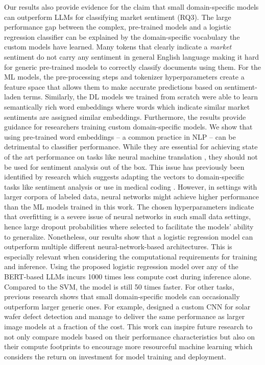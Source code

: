 Our results also provide evidence for the claim that small domain-specific models can outperform LLMs for classifying market sentiment (RQ3). The large performance gap between the complex, pre-trained models and a logistic regression classifier can be explained by the domain-specific vocabulary the custom models have learned. Many tokens that clearly indicate a \emph{market} sentiment do not carry any sentiment in general English language making it hard for generic pre-trained models to correctly classify documents using them.  For the ML models, the pre-processing steps and tokenizer hyperparameters create a feature space that allows them to make accurate predictions based on sentiment-laden terms. Similarly, the DL models we trained from scratch were able to learn semantically rich word embeddings where words which indicate similar market sentiments are assigned similar embeddings. Furthermore, the results provide guidance for researchers training custom domain-specific models. We show that using pre-trained word embeddings -- a common practice in NLP -- can be detrimental to classifier performance. While they are essential for achieving state of the art performance on tasks like neural machine translation , they should not be used for sentiment analysis out of the box. This issue has previously been identified by research which suggests adapting the vectors to domain-specific tasks like sentiment analysis  or use in medical coding .\newline
However, in settings with larger corpora of labeled data, neural networks might achieve higher performance than the ML models trained in this work. The chosen hyperparameters indicate that overfitting is a severe issue of neural networks in such small data settings, hence large dropout probabilities where selected to facilitate the models' ability to generalize. Nonetheless, our results show that a logistic regression model can outperform multiple different neural-network-based architectures. This is especially relevant when considering the computational requirements for training and inference. Using the proposed logistic regression model over any of the BERT-based LLMs incurs 1000 times less compute cost during inference alone. Compared to the SVM, the model is still 50 times faster. For other tasks, previous research shows that small domain-specific models can occasionally outperform larger generic ones. For example,  designed a custom CNN for solar wafer defect detection and manage to deliver the same performance as larger image models at a fraction of the cost. This work can inspire future research to not only compare models based on their performance characteristics but also on their compute footprints to encourage more resourceful machine learning which considers the return on investment for model training and deployment.

